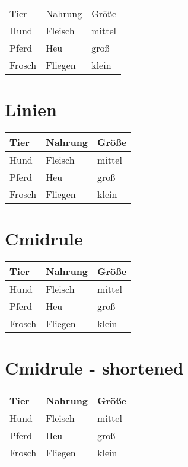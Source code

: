 \documentclass[a4paper]{article}
\begin{document}
\begin{tabular}{*{3}{l}}
    Tier   & Nahrung & Größe  \\
    Hund   & Fleisch & mittel \\
    Pferd  & Heu     & groß   \\
    Frosch & Fliegen & klein  \\
\end{tabular}

\section{Linien}
\begin{tabular}{lll}
    \toprule
    Tier   & Nahrung & Größe  \\
    \midrule
    Hund   & Fleisch & mittel \\
    Pferd  & Heu     & groß   \\
    Frosch & Fliegen & klein  \\
    \bottomrule
\end{tabular}

\section{Cmidrule}

\begin{tabular}{lll}
    \toprule
    Tier   & Nahrung & Größe  \\
    \midrule
    Hund   & Fleisch & mittel \\
    \cmidrule{1-1}
    Pferd  & Heu     & groß   \\
    \cmidrule{1-1}
    \cmidrule{3-3}
    Frosch & Fliegen & klein  \\
    \bottomrule
\end{tabular}

\section{Cmidrule - shortened}

\begin{tabular}{lll}
    \toprule
    Tier   & Nahrung & Größe  \\
    \midrule
    Hund   & Fleisch & mittel \\
    \cmidrule(r){1-2}
    Pferd  & Heu     & groß   \\
    \cmidrule(r){1-1}
    \cmidrule(rl){2-2}
    \cmidrule(l){3-3}
    Frosch & Fliegen & klein  \\
    \bottomrule
\end{tabular}
\end{document}
